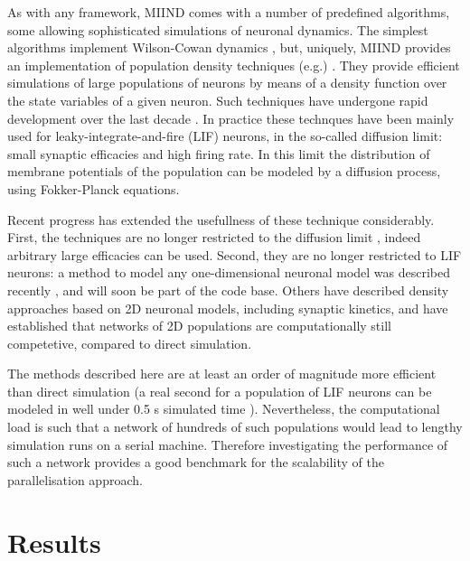 \documentclass[12pt]{article}
\begin{document}
As with any framework, MIIND comes with a number of predefined algorithms, some allowing sophisticated simulations of neuronal 
dynamics. The simplest algorithms implement Wilson-Cowan dynamics \citep{wilsonwan1972}, but, uniquely, 
MIIND provides an implementation of population density techniques (e.g.) \citep{stein1996,knight1972,knight1996}. They provide efficient simulations 
of large populations of neurons by means of a density function over the state variables of a given neuron. Such techniques have undergone rapid 
development over the last decade \citep{omurtag2000}. In practice these technques have been mainly used for leaky-integrate-and-fire (LIF) neurons,
in the so-called diffusion limit: small synaptic efficacies and high firing rate. In  this limit the distribution of membrane potentials of the
population can be modeled by a diffusion process, using Fokker-Planck equations. 

Recent progress has extended the usefullness of these technique considerably.  First, the techniques are no longer restricted to the diffusion limit 
\citep{omurtag2000,dekamps2003,dekamps2006}, indeed arbitrary large efficacies can be used.  Second, they are no longer restricted to LIF neurons: 
a method to model any one-dimensional neuronal model was described recently \citep{dekamps2013}, and will soon be part of the code base.
Others have described density approaches based on 2D neuronal models, including synaptic kinetics, and have established that networks
of 2D populations are computationally still competetive, compared to direct simulation.
  
The methods described here are at least an order of magnitude more efficient than direct simulation (a real second for a population of LIF neurons
can be modeled in well under 0.5 s simulated time \citep{dekamps2006}). Nevertheless, the computational load is such that a network of hundreds of such 
populations would lead to lengthy simulation runs on a serial machine. Therefore investigating the performance of such a network provides a good
benchmark for the scalability of the parallelisation approach.



\section{Results}
\end{document}
